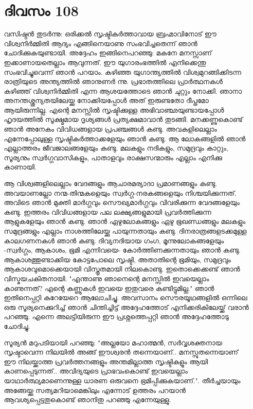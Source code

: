  
\section{ദിവസം 108}


വസിഷ്ഠന്‍ തുടര്‍ന്നു: ഒരിക്കല്‍ സൃഷ്ടികര്‍ത്താവായ ബ്രഹ്മാവിനോട്‌ ഈ വിശ്വനിര്‍മ്മിതി ആദ്യം എങ്ങിനെയാണു സംഭവിച്ചതെന്ന് ഞാന്‍ ചോദിക്കുകയുണ്ടായി. അദ്ദേഹം ഇങ്ങിനെപറഞ്ഞു: മകനേ മനസ്സാണ്‌ ഇക്കാണായതെല്ലാം ആവുന്നത്‌. ഈ യുഗാരംഭത്തില്‍ എനിക്കെന്തു സംഭവിച്ചുവെന്ന് ഞാന്‍ പറയാം. കഴിഞ്ഞ യുഗാന്ത്യത്തില്‍ വിശ്വമുറങ്ങിക്കിടന്ന രാത്രിയുടെ അന്ത്യത്തില്‍ ഞാനുണര്‍ ന്നു. പ്രഭാതത്തിലെ പ്രാര്‍ത്ഥനകള്‍ കഴിഞ്ഞ്‌ വിശ്വനിര്‍മ്മിതി എന്ന ആശയത്തോടെ ഞാന്‍ ചുറ്റും നോക്കി. ഞാനാ അനന്തശ്ശൂന്യതയിലേയ്ക്കു നോക്കിയപ്പോള്‍ അത്‌ ഇരുണ്ടതോ ദീപ്തമോ ആയിരുന്നില്ല. എന്റെ മനസ്സില്‍ സൃഷ്ടിക്കുള്ള അഭിവാഞ്ഛയുണ്ടായപ്പോള്‍ ഹൃദയത്തില്‍ സൂക്ഷ്മമായ ദൃശ്യങ്ങള്‍ പ്രത്യക്ഷമാവാന്‍ തുടങ്ങി. മനക്കണ്ണുകൊണ്ട്‌ ഞാന്‍ അനേകം വിവിധങ്ങളായ പ്രപഞ്ചങ്ങള്‍ കണ്ടു. അവകളിലെല്ലാം എന്നേപ്പോലുള്ള സൃഷ്ടികര്‍ത്താക്കളേയും ഞാന്‍ കണ്ടു. ആ ലോകങ്ങളില്‍ ഞാന്‍ എല്ലാത്തരം ജീവജാലങ്ങളേയും കണ്ടു. മലകളും നദികളും, സമുദ്രവും കാറ്റും, സൂര്യനും സ്വര്‍ഗ്ഗവാസികളും, പാതാളവും രാക്ഷസന്മാരും എല്ലാം എനിക്കു കാണായി.

ആ വിശ്വങ്ങളിലെല്ലാം വേദങ്ങളും ആചാരമര്യാദാ പ്രമാണങ്ങളും കണ്ടു. അവയാണല്ലോ നന്മ-തിന്മകളെയും സ്വര്‍ഗ്ഗ-നരകങ്ങളെയും നിശ്ചയിക്കുന്നത്‌. അവിടെ ഞാന്‍ മുക്തി മാര്‍ഗ്ഗവും സൌഖ്യമാര്‍ഗ്ഗവും വിവരിക്കുന്ന വേദങ്ങളേയും കണ്ടു. ഇത്തരം വിവിധങ്ങളായ പല ലക്ഷ്യങ്ങളുമായി പ്രവര്‍ത്തിക്കുന്ന ആളുകളേയും ഞാന്‍ കണ്ടു. ഞാന്‍ ഏഴുലോകങ്ങളും ഏഴു ഭൂഖണ്ഡങ്ങളും മലകളും സമുദ്രങ്ങളും എല്ലാം നാശത്തിലേയ്ക്കു പായുന്നതായും കണ്ടു. ദിനരാത്രങ്ങളടക്കമുള്ള കാലഗണനകള്‍ ഞാന്‍ കണ്ടു. ദിവ്യനദിയായ ഗംഗ, മൂന്നുലോകങ്ങളേയും -സ്വര്‍ഗ്ഗം, ആകാശം, ഭൂമി എന്നിവയെ- കോര്‍ത്തിണക്കുന്നതായും ഞാന്‍ കണ്ടു. ആകാശത്തുണ്ടാക്കിയ കോട്ടപോലെ സൃഷ്ടി, അതാതിന്റെ ഭൂമിയും, സമുദ്രവും ആകാശവുമൊക്കെയായി വിസ്തൃതമായി നിലകൊണ്ടു. ഇതൊക്കെക്കണ്ട്‌ ഞാന്‍ വിസ്മയചകിതനായി. "എന്താണു ഞാനെന്റെ മനസ്സില്‍ ഇവയെല്ലാം കാണുന്നത്‌? എന്റെ കണ്ണൂകള്‍ ഇവയെ ഇതുവരെ കണ്ടിട്ടുമില്ല." ഞാന്‍ ഇതിനെപ്പറ്റി കുറേയേറെ ആലോചിച്ചു. അവസാനം സൌരയൂഥങ്ങളില്‍ ഒന്നിലെ ഒരു സൂര്യനെക്കുറിച്ച്‌ ഞാന്‍ ചിന്തിച്ചിട്ട്‌ അദ്ദേഹത്തോട്‌ എനിക്കരികിലേയ്ക്ക്‌ വരാന്‍ പറഞ്ഞു. എന്നെ അലട്ടിയിരുന്ന ഈ പ്രശ്നത്തെപ്പറ്റി ഞാന്‍ അദ്ദേഹത്തോടു ചോദിച്ചു.

സൂര്യന്‍ മറുപടിയായി പറഞ്ഞു: "അല്ലയോ മഹാത്മന്‍, സര്‍വ്വശക്തനായ സൃഷ്ടാവെന്ന നിലയില്‍ അങ്ങ്‌ ഈശ്വരന്‍ തന്നെയാണ്‌.. മനസ്സുതന്നെയാണ്‌ ഈ നിലയ്ക്കാത്ത പ്രവര്‍ത്തനങ്ങളും അന്തമില്ലാത്ത സൃഷ്ടികളൂം ആയി കാണപ്പെടുന്നത്‌.. അവിദ്യയുടെ പ്രാഭവംകൊണ്ട്‌ ഇവയെല്ലാം യാഥാര്‍ത്ഥ്യമാണെന്നുള്ള ധാരണ ഒരുവനെ ഭ്രമിപ്പിക്കുകയാണ്‌.". തീര്‍ച്ചയായും അങ്ങേയ്ക്കു സത്യമറിയാമെങ്കിലും എന്നോട്‌ ഉത്തരം പറയാന്‍ ആവശ്യപ്പെട്ടതുകൊണ്ട്‌ ഞാനിതു പറഞ്ഞു എന്നേയുള്ളു.
